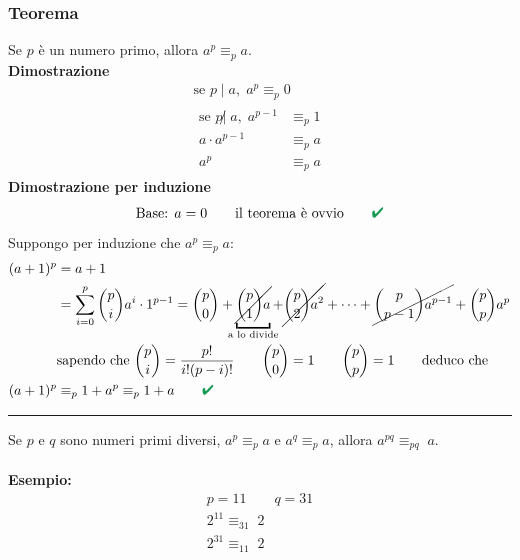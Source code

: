 \documentclass[italian]{article}
\newcommand{\divides}[2]{\text{$#1 \;|\; #2$}}
\newcommand{\notdivides}[2]{\text{$#1 \not|\; #2$}}
\newcommand{\linea}{\begin{center}\rule{5cm}{1pt}\end{center}}
\newcommand{\congruente}[1]{\text{$\equiv_{#1}\;$}}
\renewcommand{\checkmark}{\textcolor{ForestGreen}{\text{$\qquad$\ding{52}}}}
\begin{document}
\subsubsection{Teorema}
Se $p$ è un numero primo, allora $ a^{p} \equiv_p a $.\\[2mm]
\textbf{Dimostrazione}
\begin{gather*}
	\text{se } \divides{p}{a},\; a^{p} \equiv_p 0 \\
	\begin{split}
		\text{se } \notdivides{p}{a},\; a^{p-1} &\equiv_p 1 \\
		a\cdot a^{p-1} &\equiv_p a\\
		a^{p} &\equiv_p a
	\end{split}	
\end{gather*}
\textbf{Dimostrazione per induzione}
\[
	\text{Base: } a=0 \qquad \text{il teorema è ovvio} \checkmark \\
\]
Suppongo per induzione che $ a^{p} \equiv_p a $:
\begin{gather*}
	\begin{split}
		(a+1)^{p} &= a+1\\
		&= \sum_{i=0}^{p} \binom{p}{i}a^i \cdot 1^{p-1} = \binom{p}{0} + \underbracket{\cancel{\binom{p}{1}a}}_{\mathclap{\text{a lo divide}}} + \cancel{\binom{p}{2}a^2} + \dots + \cancel{\binom{p}{p-1}a^{p-1}} + \binom{p}{p}a^p\\
		& \text{sapendo che } \binom{p}{i} = \dfrac{p!}{i!(p-i)!} \qquad \binom{p}{0} = 1 \qquad \binom{p}{p} = 1 \qquad \text{deduco che}\\
		(a+1)^{p} &\equiv_p 1 + a^{p} \equiv_p 1 + a \checkmark
	\end{split}\\
\end{gather*}
\linea


\noindent
Se $p$ e $q$ sono numeri primi diversi, $a^{p} \equiv_p a$ e $ a^{q} \equiv_p a$, allora $a^{pq} \congruente{pq} a$.\\\\
\textbf{Esempio:}
\begin{gather*}
	p=11 \qquad q=31 \\
	2^{11} \congruente{31} 2\\
	2^{31} \congruente{11} 2
\end{gather*}
\end{document}
